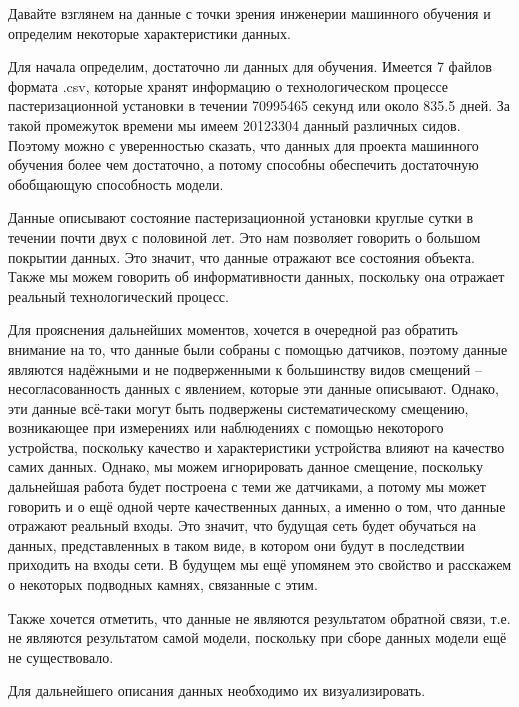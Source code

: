{  \par \redline Давайте взглянем на данные с точки зрения инженерии машинного обучения и определим некоторые характеристики данных. 

  \par \redline Для начала определим, достаточно ли данных для обучения. Имеется 7 файлов формата .csv, которые хранят информацию о технологическом процессе пастеризационной установки в течении 70995465 секунд или около 835.5 дней. За такой промежуток времени мы имеем 20123304 данный различных сидов. Поэтому можно с уверенностью сказать, что данных для проекта машинного обучения более чем достаточно, а потому способны обеспечить достаточную обобщающую способность модели.

  \par \redline Данные описывают состояние пастеризационной установки круглые сутки в течении почти двух с половиной лет. Это нам позволяет говорить о большом покрытии данных. Это значит, что данные отражают все состояния объекта. Также мы можем говорить об информативности данных, поскольку она отражает реальный технологический процесс.

  \par \redline Для прояснения дальнейших моментов, хочется в очередной раз обратить внимание на то, что данные были собраны с помощью датчиков, поэтому данные являются надёжными и не подверженными к большинству видов смещений – несогласованность данных с явлением, которые эти данные описывают.  Однако, эти данные всё-таки могут быть подвержены систематическому смещению, возникающее при измерениях или наблюдениях с помощью некоторого устройства, поскольку качество и характеристики устройства влияют на качество самих данных. Однако, мы можем игнорировать данное смещение, поскольку дальнейшая работа будет построена с теми же датчиками, а потому мы может говорить и о ещё одной черте качественных данных, а именно о том, что данные отражают реальный входы. Это значит, что будущая сеть будет обучаться на данных, представленных в таком виде, в котором они будут в последствии приходить на входы сети. В будущем мы ещё упомянем это свойство и расскажем о некоторых подводных камнях, связанные с этим.

  \par \redline Также хочется отметить, что данные не являются результатом обратной связи, т.е. не являются результатом самой модели, поскольку при сборе данных модели ещё не существовало.

  \par \redline Для дальнейшего описания данных необходимо их визуализировать. 

}
